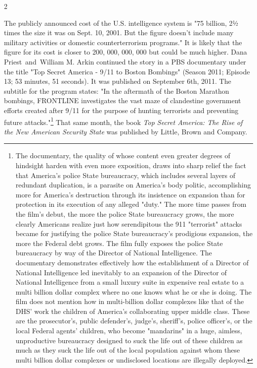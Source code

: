 \documentclass[10pt,a4paper,twoside]{article} %
\begin{document}
\begin{multicols}{2}
{{\indent The publicly announced cost of the U.S. intelligence system is "75 billion, 2½ times the size it was on Sept. 10, 2001. But the figure doesn't include many military activities or domestic counterterrorism programs." It is likely that the figure for its cost is closer to 200, 000, 000, 000 but could be much higher. 
\newline \indent Dana Priest and William M. Arkin continued the story in a PBS documentary under the title "Top Secret America - 9/11 to Boston Bombings" (Season 2011; Episode 13; 53 minutes, 51 seconds). It was published on September 6th, 2011. The subtitle for the program states: "In the aftermath of the Boston Marathon bombings, FRONTLINE investigates the vast maze of clandestine government efforts created after 9/11 for the purpose of hunting terrorists and preventing future attacks."\footnote{The documentary, the quality of whose content even greater degrees of hindsight harden with even more exposition, draws into sharp relief the fact that America's police State bureaucracy, which includes several layers of redundant duplication, is a parasite on America's body politic, accomplishing more for America's destruction through its insistence on expansion than for protection in its execution of any alleged "duty." The more time passes from the film's debut, the more the police State bureaucracy grows, the more clearly Americans realize just how serendipitous the 911 "terrorist" attacks became for justifying the police State bureaucracy's prodigious expansion, the more the Federal debt grows. The film fully exposes the police State bureaucracy by way of the Director of National Intelligence. The documentary demonstrates effectively how the establishment of a Director of National Intelligence led inevitably to an expansion of the Director of National Intelligence from a small luxury suite in expensive real estate to a multi billion dollar complex where no one knows what he or she is doing. The film does not mention how in multi-billion dollar complexes like that of the DHS' work the children of America's collaborating upper middle class. These are the prosecutor's, public defender's, judge's, sheriff's, police officer's, or the local Federal agents' children, who become "mandarins" in a huge, aimless, unproductive bureaucracy designed to suck the life out of these children as much as they suck the life out of the local population against whom these multi billion dollar complexes or undisclosed locations are illegally deployed.} That same month, the book \textenglish{\emph{Top Secret America: The Rise of the New American Security State}} was published by Little, Brown and Company.}

}
\end{multicols}
\end{document}
